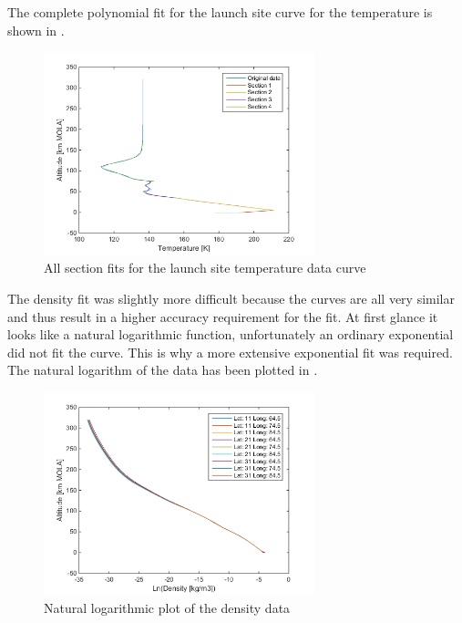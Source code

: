 \noindent
The complete polynomial fit for the launch site curve for the temperature is shown in .

\begin{figure}[H]
\centering
\includegraphics[width=0.7\textwidth]{figures/software/completePolyFitTempSplit5.png}
\caption{All section fits for the launch site temperature data curve}
\label{fig:completePolyFitTempSplit5}
\end{figure}



\noindent
The density fit was slightly more difficult because the curves are all very similar and thus result in a higher accuracy requirement for the fit. At first glance it looks like a natural logarithmic function, unfortunately an ordinary exponential did not fit the curve. This is why a more extensive exponential fit was required. The natural logarithm of the data has been plotted in .

\begin{figure}[H]
\centering
\includegraphics[width=0.7\textwidth]{figures/software/lnPlotDataDen.png}
\caption{Natural logarithmic plot of the density data}
\label{fig:lnPlotDataDen}
\end{figure}

